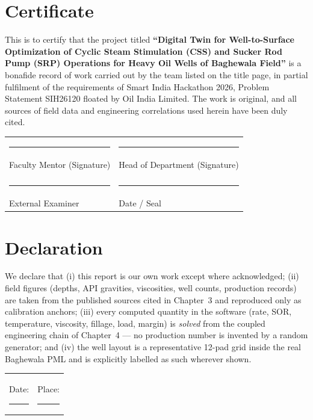\documentclass[12pt,a4paper]{report}
\begin{document}
\chapter*{Certificate}
This is to certify that the project titled \textbf{``Digital Twin for
Well-to-Surface Optimization of Cyclic Steam Stimulation (CSS) and Sucker Rod
Pump (SRP) Operations for Heavy Oil Wells of Baghewala Field''} is a bonafide
record of work carried out by the team listed on the title page, in partial
fulfilment of the requirements of Smart India Hackathon 2026, Problem Statement
SIH26120 floated by Oil India Limited. The work is original, and all sources of
field data and engineering correlations used herein have been duly cited.

\vspace{30pt}
\begin{tabular}{p{7cm}p{7cm}}
\rule{5.5cm}{0.4pt} & \rule{5.5cm}{0.4pt} \\
Faculty Mentor (Signature) & Head of Department (Signature) \\
 & \\
\rule{5.5cm}{0.4pt} & \rule{5.5cm}{0.4pt} \\
External Examiner & Date / Seal \\
\end{tabular}

\chapter*{Declaration}
We declare that (i) this report is our own work except where acknowledged;
(ii) field figures (depths, API gravities, viscosities, well counts, production
records) are taken from the published sources cited in Chapter~3 and reproduced
only as calibration anchors; (iii) every computed quantity in the software
(rate, SOR, temperature, viscosity, fillage, load, margin) is \emph{solved} from
the coupled engineering chain of Chapter~4 --- no production number is invented
by a random generator; and (iv) the well layout is a representative 12-pad grid
inside the real Baghewala PML and is explicitly labelled as such wherever shown.

\vspace{24pt}
\begin{tabular}{ll}
Date: \rule{4cm}{0.4pt} & Place: \rule{5cm}{0.4pt} \\
\end{tabular}
\vspace{12pt}
\end{document}
